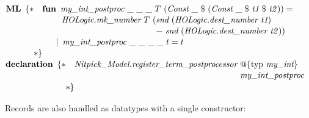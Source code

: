 \documentclass[a4paper,12pt]{article}
\begin{document}
\prew
$\textbf{ML}~\,\{{*} \\
\!\begin{aligned}[t]
& \textbf{fun}\,~\textit{my\_int\_postproc}~\_~\_~\_~T~(\textit{Const}~\_~\$~(\textit{Const}~\_~\$~\textit{t1}~\$~\textit{t2\/})) = {} \\[-2pt]
& \phantom{fun}\,~\textit{HOLogic.mk\_number}~T~(\textit{snd}~(\textit{HOLogic.dest\_number~t1}) \\[-2pt]
& \phantom{fun\,~\textit{HOLogic.mk\_number}~T~(}{-}~\textit{snd}~(\textit{HOLogic.dest\_number~t2\/})) \\[-2pt]
& \phantom{fun}\!{\mid}\,~\textit{my\_int\_postproc}~\_~\_~\_~\_~t = t \\[-2pt]
{*}\}\end{aligned}$ \\[2\smallskipamount]
$\textbf{declaration}~\,\{{*} \\
\!\begin{aligned}[t]
& \textit{Nitpick\_Model.register\_term\_postprocessor}~\!\begin{aligned}[t]
  & @\{\textrm{typ}~\textit{my\_int}\} \\[-2pt]
  & \textit{my\_int\_postproc}\end{aligned} \\[-2pt]
{*}\}\end{aligned}$
\postw

Records are also handled as datatypes with a single constructor:
\end{document}
